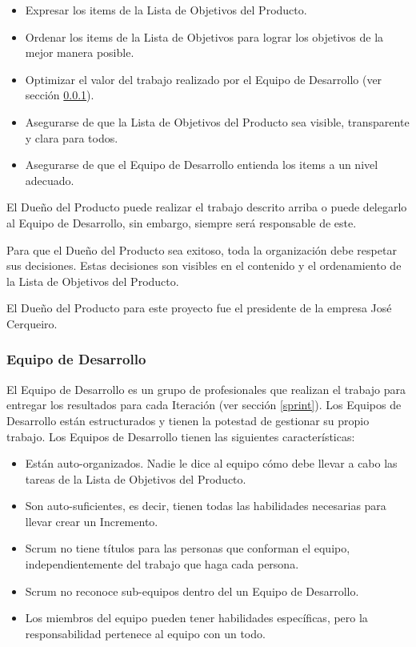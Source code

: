 \begin{itemize}
    \item Expresar los items de la Lista de Objetivos del Producto.
    \item Ordenar los items de la Lista de Objetivos para lograr los objetivos de la mejor manera posible.
    \item Optimizar el valor del trabajo realizado por el Equipo de Desarrollo (ver sección \ref{developmentTeam}).
    \item Asegurarse de que la Lista de Objetivos del Producto sea visible, transparente y clara para todos.
    \item Asegurarse de que el Equipo de Desarrollo entienda los items a un nivel adecuado.
\end{itemize}

El Dueño del Producto puede realizar el trabajo descrito arriba o puede delegarlo al Equipo de Desarrollo, sin embargo, siempre será responsable de este.

Para que el Dueño del Producto sea exitoso, toda la organización debe respetar sus decisiones. Estas decisiones son visibles en el contenido y el ordenamiento de la Lista de Objetivos del Producto. \cite{scrumSchwaber}

El Dueño del Producto para este proyecto fue el presidente de la empresa José Cerqueiro.

\subsubsection{Equipo de Desarrollo} \label{developmentTeam}
El Equipo de Desarrollo es un grupo de profesionales que realizan el trabajo para entregar los resultados para cada Iteración (ver sección \ref{sprint}). Los Equipos de Desarrollo están estructurados y tienen la potestad de gestionar su propio trabajo. Los Equipos de Desarrollo tienen las siguientes características:

\begin{itemize}
    \item Están auto-organizados. Nadie le dice al equipo cómo debe llevar a cabo las tareas de la Lista de Objetivos del Producto.
    \item Son auto-suficientes, es decir, tienen todas las habilidades necesarias para llevar crear un Incremento.
    \item Scrum no tiene títulos para las personas que conforman el equipo, independientemente del trabajo que haga cada persona.
    \item Scrum no reconoce sub-equipos dentro del un Equipo de Desarrollo.
    \item Los miembros del equipo pueden tener habilidades específicas, pero la responsabilidad pertenece al equipo con un todo. \cite{scrumSchwaber}
\end{itemize}

